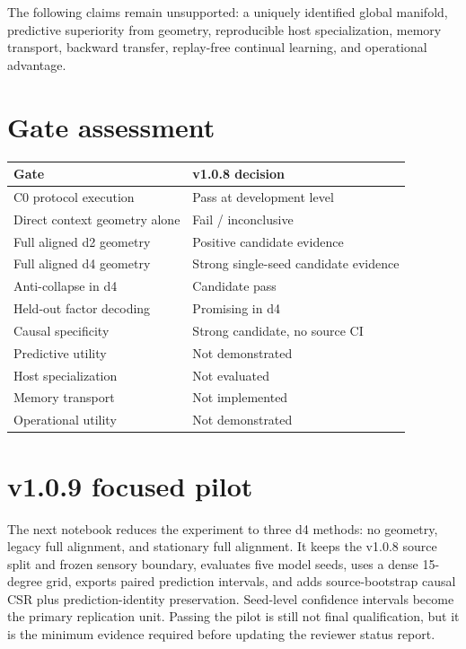 \documentclass[10pt]{article}
\begin{document}
The following claims remain unsupported: a uniquely identified global manifold, predictive superiority from geometry, reproducible host specialization, memory transport, backward transfer, replay-free continual learning, and operational advantage.

\section{Gate assessment}
\begin{center}
\begin{tabularx}{\linewidth}{@{}lX@{}}
\toprule
Gate & v1.0.8 decision \\
\midrule
C0 protocol execution & Pass at development level \\
Direct context geometry alone & Fail / inconclusive \\
Full aligned d2 geometry & Positive candidate evidence \\
Full aligned d4 geometry & Strong single-seed candidate evidence \\
Anti-collapse in d4 & Candidate pass \\
Held-out factor decoding & Promising in d4 \\
Causal specificity & Strong candidate, no source CI \\
Predictive utility & Not demonstrated \\
Host specialization & Not evaluated \\
Memory transport & Not implemented \\
Operational utility & Not demonstrated \\
\bottomrule
\end{tabularx}
\end{center}

\section{v1.0.9 focused pilot}
The next notebook reduces the experiment to three d4 methods: no geometry, legacy full alignment, and stationary full alignment. It keeps the v1.0.8 source split and frozen sensory boundary, evaluates five model seeds, uses a dense 15-degree grid, exports paired prediction intervals, and adds source-bootstrap causal CSR plus prediction-identity preservation. Seed-level confidence intervals become the primary replication unit. Passing the pilot is still not final qualification, but it is the minimum evidence required before updating the reviewer status report.
\end{document}
